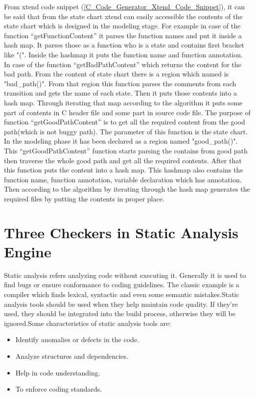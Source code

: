 From xtend code snippet (\ref{C_Code_Generator_Xtend_Code_Snippet}), it can be said that from the state chart xtend can easily accessible the contents of the state chart which is designed in the modeling stage. For example in case of the function \enquote{getFunctionContent} it parses the function names and put it inside a hash map. It parses those as a function who is a state and contains first bracket like "(". Inside the hashmap it puts the function name and function annotation. In case of the function \enquote{getBadPathContent} which returns the content for the bad path. From the content of state chart there is a region which named is "bad\_path()". From that region this function parses the comments from each transition and gets the name of each state. Then it puts those contents into a hash map. Through iterating that map according to the algorithm it puts some part of contents in C header file and some part in source code file. The purpose of function \enquote{getGoodPathContent} is to get all the required content from the good path(which is not buggy path). The parameter of this function is the state chart. In the modeling phase it has been declared as a region named "good\_path()". This \enquote{getGoodPathContent} function starts parsing the contains from good path then traverse the whole good path and get all the required contents. After that this function puts the content into a hash map. This hashmap also contains the function name, function annotation, variable declaration which has annotation. Then according to the algorithm by iterating through the hash map generates the required files by putting the contents in proper place. 

\section{Three Checkers in Static Analysis Engine}
Static analysis refers analyzing code without executing it. Generally it is used to find bugs or ensure conformance to coding guidelines. The classic example is a compiler which finds lexical, syntactic and even some semantic mistakes.Static analysis tools should be used when they help maintain code quality. If they're used, they should be integrated into the build process, otherwise they will be ignored.Some characteristics of static analysis tools are:
\begin{itemize}	
	\item Identify anomalies or defects in the code.
	\item Analyze structures and dependencies.
	\item Help in code understanding.
	\item To enforce coding standards.
\end{itemize}

